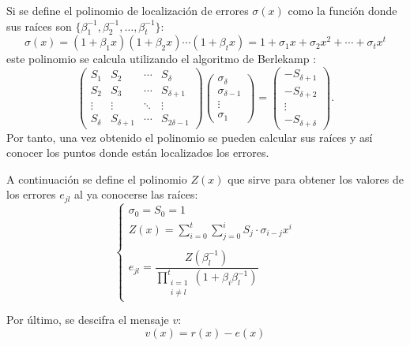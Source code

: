 \begin{itemize}
	Si se define el polinomio de localización de errores \(\sigma(x)\) como la función donde sus raíces son \(\{\beta_1^{-1},\beta_2^{-1},\ldots , \beta_t^{-1}\}\):
	\begin{equation}
		\sigma(x) = (1 + \beta_1 x)(1 + \beta_2 x) \cdots (1 + \beta_t x) 
		= 1 + \sigma_1 x + \sigma_2 x^2 + \cdots + \sigma_t x^t
	\end{equation}
	este polinomio se calcula utilizando el algoritmo de Berlekamp \cite{24hqc}:
	\begin{equation}
		{\displaystyle 
			\begin{pmatrix}
				S_{1}&S_{2}&\cdots &S_{\delta }\\
				S_{2}&S_{3}&\cdots &S_{\delta +1}\\
				\vdots &\vdots &\ddots &\vdots \\
				S_{\delta }&S_{\delta +1}&\cdots &S_{2\delta -1}
			\end{pmatrix}
			\begin{pmatrix}
				\sigma _{\delta }\\
				\sigma _{\delta -1}\\
				\vdots \\
				\sigma _{1}
			\end{pmatrix}
			=
			\begin{pmatrix}
				- S_{\delta +1}\\
				- S_{\delta +2}\\
				\vdots \\
				- S_{\delta +\delta }
			\end{pmatrix}.
		}
	\end{equation}
	 Por tanto, una vez obtenido el polinomio se pueden calcular sus raíces y así conocer los puntos donde están localizados los errores.
	\newline
	
	A continuación se define el polinomio \(Z(x)\) que sirve para obtener los valores de los errores \(e_{jl}\) al ya conocerse las raíces:
	\begin{equation}
		\left\{
		\begin{array}{l}
			\sigma_0=S_0=1\\
			Z(x)=\sum\limits_{i=0}^t\sum\limits_{j=0}^i S_j\cdot \sigma_{i-j} x^i\\\\
			e_{jl}=\dfrac{Z(\beta_l^{-1})}{\prod_{\substack{i=1 \\ i \neq l}}^t \left( 1 + \beta_i \beta_l^{-1} \right)}
		\end{array}\right.
	\end{equation}
	
	Por último, se descifra el mensaje \(v\):
	\begin{equation}
		v(x)=r(x)-e(x)
	\end{equation}
\end{itemize}


